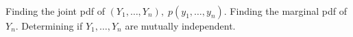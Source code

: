 \documentclass{mthe353answer}
\begin{document}
  \begin{questions}
    \setcounter{question}{3}
    \question{}\
    \begin{subparts}
      \subpart{}
      Finding the joint pdf of \((Y_1, \dots, Y_n),\; p(y_1, \dots, y_n)\).
      \subpart{}
      Finding the marginal pdf of \(Y_n\).
      \subpart{}
      Determining if \(Y_1, \dots, Y_n\) are mutually independent.
    \end{subparts}
  \end{questions}
\end{document}

